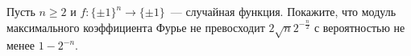 Пусть $n \ge 2$ и $f\colon \{\pm 1\}^n \to \{\pm 1\}$~--- случайная функция. Покажите, что модуль
максимального коэффициента Фурье не превосходит $2 \sqrt{n} 2^{-\frac{n}{2}}$ с вероятностью не менее
$1 - 2^{-n}$.
